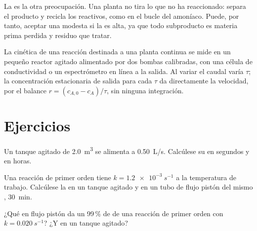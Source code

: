 La  es la otra preocupación. Una planta no tira lo que no ha
reaccionado: separa el producto y recicla los reactivos, como en el
bucle del amoníaco. Puede, por tanto, aceptar una  modesta si la
 es alta, ya que todo subproducto es materia prima perdida y residuo que
tratar.

\begin{inthelab}
La cinética de una reacción destinada a una planta continua se mide en un
pequeño reactor agitado alimentado por dos bombas calibradas, con una célula de conductividad
o un espectrómetro en línea a la salida. Al variar el caudal varía $\tau$;
la concentración estacionaria de salida para cada $\tau$ da directamente la velocidad, por el
balance $r = (c_{A,0} - c_A)/\tau$, sin ninguna integración.
\end{inthelab}

\section{Ejercicios}

\begin{exercise}[$\star$]\label{exo:b2:continuous-reactors:1}
Un tanque agitado de \qty{2.0}{m^3} se alimenta a \qty{0.50}{L/s}. Calcúlese su
 en segundos y en horas.
\end{exercise}

\begin{exercise}[$\star$]\label{exo:b2:continuous-reactors:2}
Una reacción de primer orden tiene $k = \qty{1.2e-3}{s^{-1}}$ a la temperatura de
trabajo. Calcúlese la  en un tanque agitado y en un tubo de flujo pistón
del mismo , \qty{30}{min}.
\end{exercise}

\begin{exercise}[$\star$]\label{exo:b2:continuous-reactors:3}
¿Qué  en flujo pistón da un 99\,\% de  de una reacción de primer
orden con $k = \qty{0.020}{s^{-1}}$? ¿Y en un tanque agitado?
\end{exercise}

